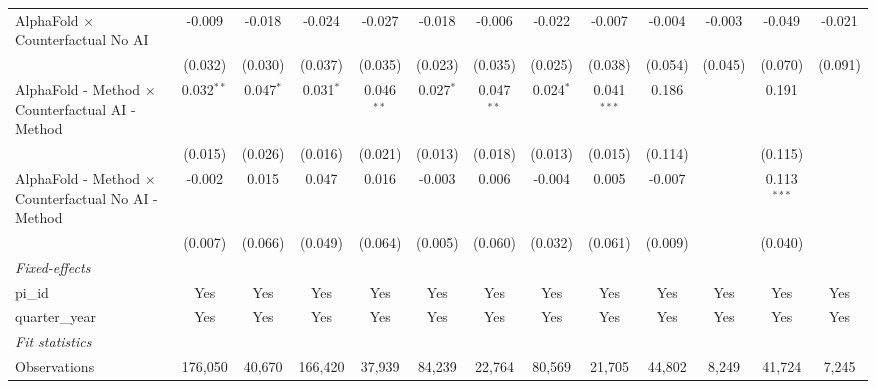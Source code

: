 \begin{tabular}{lcccccccccccc}
   AlphaFold $\times$ Counterfactual No AI                    & -0.009        & -0.018        & -0.024        & -0.027        & -0.018       & -0.006        & -0.022       & -0.007        & -0.004       & -0.003       & -0.049        & -0.021\\   
                                                              & (0.032)       & (0.030)       & (0.037)       & (0.035)       & (0.023)      & (0.035)       & (0.025)      & (0.038)       & (0.054)      & (0.045)      & (0.070)       & (0.091)\\   
   AlphaFold - Method $\times$ Counterfactual AI - Method     & 0.032$^{**}$  & 0.047$^{*}$   & 0.031$^{*}$   & 0.046$^{**}$  & 0.027$^{*}$  & 0.047$^{**}$  & 0.024$^{*}$  & 0.041$^{***}$ & 0.186        &              & 0.191         &   \\   
                                                              & (0.015)       & (0.026)       & (0.016)       & (0.021)       & (0.013)      & (0.018)       & (0.013)      & (0.015)       & (0.114)      &              & (0.115)       &   \\   
   AlphaFold - Method $\times$ Counterfactual No AI - Method  & -0.002        & 0.015         & 0.047         & 0.016         & -0.003       & 0.006         & -0.004       & 0.005         & -0.007       &              & 0.113$^{***}$ &   \\   
                                                              & (0.007)       & (0.066)       & (0.049)       & (0.064)       & (0.005)      & (0.060)       & (0.032)      & (0.061)       & (0.009)      &              & (0.040)       &   \\   
   \midrule
   \emph{Fixed-effects}\\
   pi\_id                                                     & Yes           & Yes           & Yes           & Yes           & Yes          & Yes           & Yes          & Yes           & Yes          & Yes          & Yes           & Yes\\  
   quarter\_year                                              & Yes           & Yes           & Yes           & Yes           & Yes          & Yes           & Yes          & Yes           & Yes          & Yes          & Yes           & Yes\\  
   \midrule
   \emph{Fit statistics}\\
   Observations                                               & 176,050       & 40,670        & 166,420       & 37,939        & 84,239       & 22,764        & 80,569       & 21,705        & 44,802       & 8,249        & 41,724        & 7,245\\  

\end{tabular}
